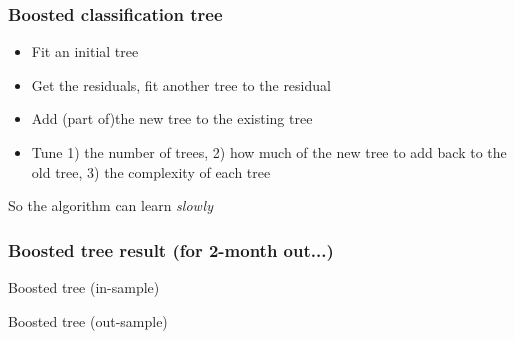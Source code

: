 \documentclass{beamer}
\begin{document}
\begin{frame}
\frametitle{Boosted classification tree}
\begin{itemize}
\item Fit an initial tree
\item Get the residuals, fit another tree to the residual
\item Add (part of)the new tree to the existing tree
\item Tune 1) the number of trees, 2) how much of the new tree to add back to the old tree, 3) the complexity of each tree
\end{itemize}

So the algorithm can learn \textit{slowly}
\end{frame}

\begin{frame}
\frametitle{Boosted tree result (for 2-month out...)}
\begin{table}
	
	\caption{Boosted tree (in-sample)}
\end{table}
\begin{table}
	
	\caption{Boosted tree (out-sample)}
\end{table}

\end{frame}
\end{document}
